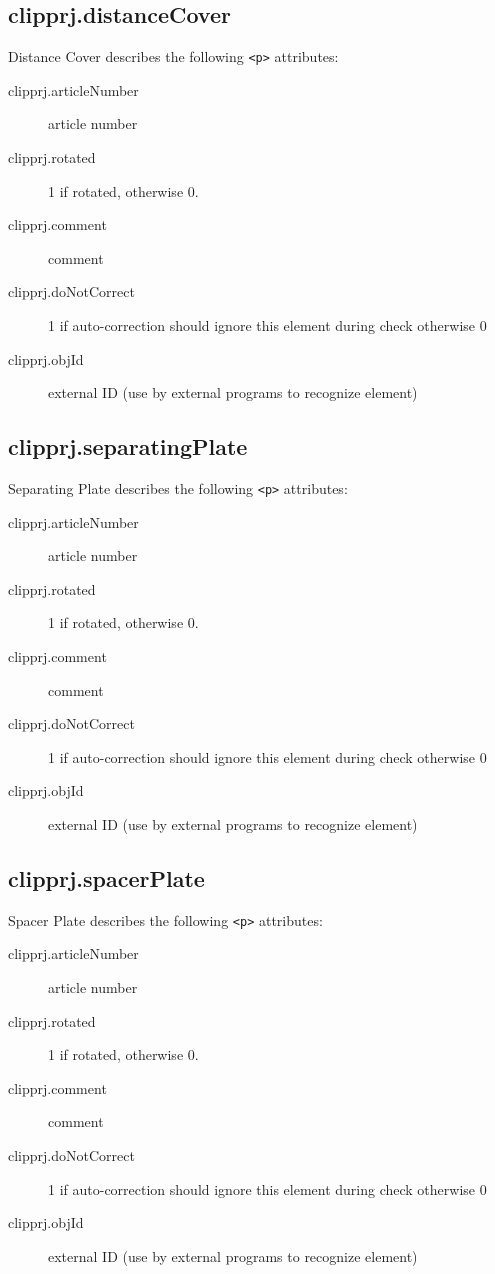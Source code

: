 \documentclass[%
	a4paper,
	oneside,
	listof=numbered,
	parskip=half,
	headsepline=true,
	footsepline=false,
	0.7headlines,
	]{scrbook}
\begin{document}
\subsection{clipprj.distanceCover}
 
Distance Cover describes the following \verb|<p>| attributes: 

\begin{description}
	\item[clipprj.articleNumber] article number 
	\item[clipprj.rotated] 1 if rotated, otherwise 0. 
	\item[clipprj.comment] comment 
	\item[clipprj.doNotCorrect] 1 if auto-correction should ignore this element during check otherwise 0 
	\item[clipprj.objId] external ID (use by external programs to recognize element) 
\end{description}

\subsection{clipprj.separatingPlate}
 
Separating Plate describes the following \verb|<p>| attributes: 

\begin{description}
	\item[clipprj.articleNumber] article number 
	\item[clipprj.rotated] 1 if rotated, otherwise 0. 
	\item[clipprj.comment] comment 
	\item[clipprj.doNotCorrect] 1 if auto-correction should ignore this element during check otherwise 0 
	\item[clipprj.objId] external ID (use by external programs to recognize element) 
\end{description}

\subsection{clipprj.spacerPlate}
 
Spacer Plate describes the following \verb|<p>| attributes: 

\begin{description}
	\item[clipprj.articleNumber] article number 
	\item[clipprj.rotated] 1 if rotated, otherwise 0. 
	\item[clipprj.comment] comment 
	\item[clipprj.doNotCorrect] 1 if auto-correction should ignore this element during check otherwise 0 
	\item[clipprj.objId] external ID (use by external programs to recognize element) 
\end{description}
\end{document}
